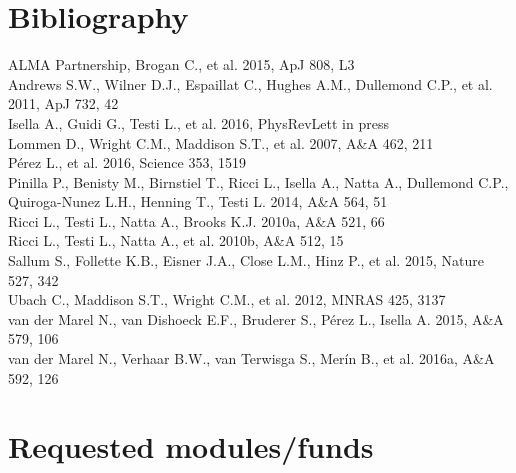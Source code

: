 \documentclass[10pt,fleqn,twoside]{article}
\begin{document}
% 
% 
% 

\section{Bibliography}

ALMA Partnership, Brogan C., et al. 2015, ApJ 808, L3\\
Andrews S.W., Wilner D.J., Espaillat C., Hughes A.M., Dullemond C.P., et al. 2011, ApJ 732, 42\\
Isella A., Guidi G., Testi L., et al. 2016, PhysRevLett in press\\
Lommen D., Wright C.M., Maddison S.T., et al. 2007, A\&A 462, 211\\
P\'{e}rez L., et al. 2016, Science 353, 1519\\
Pinilla P., Benisty M., Birnstiel T., Ricci L., Isella A., Natta A., Dullemond C.P., Quiroga-Nunez L.H., Henning T., Testi L. 2014, A\&A 564, 51\\
Ricci L., Testi L., Natta A., Brooks K.J. 2010a, A\&A 521, 66\\
Ricci L., Testi L., Natta A., et al. 2010b, A\&A 512, 15\\
Sallum S., Follette K.B., Eisner J.A., Close L.M., Hinz P., et al. 2015, Nature 527, 342\\
Ubach C., Maddison S.T., Wright C.M., et al. 2012, MNRAS 425, 3137\\
van der Marel N., van Dishoeck E.F., Bruderer S., P\'{e}rez L., Isella A. 2015, A\&A 579, 106\\
van der Marel N., Verhaar B.W., van Terwisga S., Mer\'{i}n B., et al. 2016a, A\&A 592, 126\\

\section{Requested modules/funds}
\renewcommand{\leftmark}{\sc  Requested modules/funds}
\end{document}
